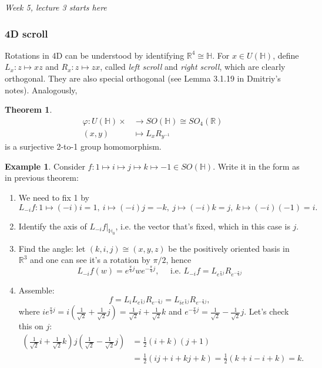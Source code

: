 \documentclass[a4paper]{article}
\newcommand{\R}{\mathbb{R}}
\newcommand{\Hq}{\mathbb{H}}
\theoremstyle{definition}
\newtheorem{thm}[defn]{Theorem}
\newtheorem{example}[defn]{Example}
\begin{document}
\begin{flushright}
\textit{Week 5, lecture 3 starts here}
\end{flushright}

\subsubsection{4D scroll}
Rotations in 4D can be understood by identifying $\R^4\cong\Hq$. For $x\in U(\Hq)$, define $L_x:z\mapsto xz$ and $R_x:z\mapsto zx$, called \textit{left scroll} and \textit{right scroll}, which are clearly orthogonal. They are also special orthogonal (see Lemma 3.1.19 in Dmitriy's notes). Analogously,
\begin{thm}
\[
\begin{aligned}
\varphi:U(\Hq)\times&\rightarrow SO(\Hq)\cong SO_4(\R)\\
(x,y)&\mapsto L_xR_{y^{-1}}
\end{aligned}
\]
is a surjective 2-to-1 group homomorphism.
\end{thm}

\begin{example}
Consider $f:1\mapsto i\mapsto j\mapsto k\mapsto -1\in SO(\Hq)$. Write it in the form as in previous theorem:
\begin{enumerate}
\item We need to fix 1 by \[
L_{-i}f:1\mapsto (-i)i=1,\ i\mapsto (-i)j=-k,\ j\mapsto (-i)k=j,\ k\mapsto (-i)(-1)=i.
\]
\item Identify the axis of $L_{-i}f|_{\Hq_0}$, i.e. the vector that's fixed, which in this case is $j$.
\item Find the angle: let $(k,i,j)\cong(x,y,z)$ be the positively oriented basis in $\R^3$ and one can see it's a rotation by $\pi/2$, hence
\[
L_{-i}f(w)=e^{\frac{\pi}{4}j}we^{-\frac{\pi}{4}j},\quad \text{ i.e. }L_{-i}f=L_{e^{\frac{\pi}{4}j}}R_{e^{-\frac{\pi}{4}j}}
\]
\item Assemble:
\[
f=L_i L_{e^{\frac{\pi}{4}j}} R_{e^{-\frac{\pi}{4}j}}=L_{ie^{\frac{\pi}{4}j}} R_{e^{-\frac{\pi}{4}j}},
\]
where $ie^{\frac{\pi}{4}j}=i\left(\frac{1}{\sqrt 2}+\frac{1}{\sqrt 2}j\right)=\frac{1}{\sqrt 2}i+\frac{1}{\sqrt 2}k$ and $e^{-\frac{\pi}{4}j}=\frac{1}{\sqrt 2}-\frac{1}{\sqrt 2}j$. Let's check this on $j$:
\[
\begin{aligned}
\left(\frac{1}{\sqrt 2}i+\frac{1}{\sqrt 2}k\right)j\left(\frac{1}{\sqrt 2}-\frac{1}{\sqrt 2}j\right)&=\frac12 (i+k)(j+1)\\
&=\frac12 (ij+i+kj+k)=\frac12(k+i-i+k)=k.
\end{aligned}
\]
\end{enumerate}
\end{example}
\end{document}
